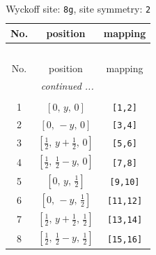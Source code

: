 \documentclass[fleqn,8pt]{jsarticle}
\begin{document}
\begin{longtable}{ccc}
\caption{Wyckoff site: {\tt 8g}, site symmetry: {\tt 2}}
 \\
 \hline \hline
No. & position & mapping \\ \hline \endfirsthead

\multicolumn{2}{l}{\tablename\ \thetable{}} \\
 \hline \hline
No. & position & mapping \\ \hline \endhead

 \hline \hline
\multicolumn{2}{r}{\footnotesize\it continued ...} \\ \endfoot

 \hline \hline
\multicolumn{2}{r}{} \\ \endlastfoot

1 & $\left[ 0,\, y,\, 0 \right]$ & {\tt [1,2]} \\ \hline
2 & $\left[ 0,\, - y,\, 0 \right]$ & {\tt [3,4]} \\ \hline
3 & $\left[ \frac{1}{2},\, y + \frac{1}{2},\, 0 \right]$ & {\tt [5,6]} \\ \hline
4 & $\left[ \frac{1}{2},\, \frac{1}{2} - y,\, 0 \right]$ & {\tt [7,8]} \\ \hline
5 & $\left[ 0,\, y,\, \frac{1}{2} \right]$ & {\tt [9,10]} \\ \hline
6 & $\left[ 0,\, - y,\, \frac{1}{2} \right]$ & {\tt [11,12]} \\ \hline
7 & $\left[ \frac{1}{2},\, y + \frac{1}{2},\, \frac{1}{2} \right]$ & {\tt [13,14]} \\ \hline
8 & $\left[ \frac{1}{2},\, \frac{1}{2} - y,\, \frac{1}{2} \right]$ & {\tt [15,16]} \\
\end{longtable}
\renewcommand{\arraystretch}{1.2}
\end{document}
